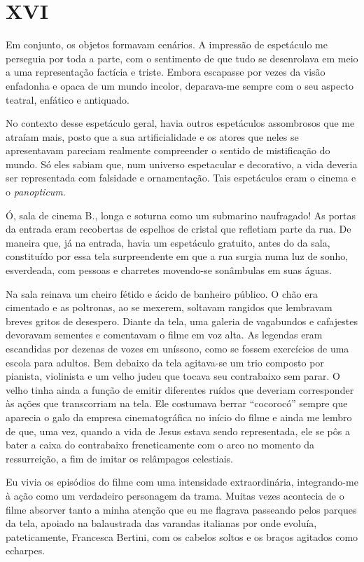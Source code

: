 \chapter*{\centering\Large{XVI}}

Em conjunto, os objetos formavam cenários. A impressão de espetáculo me perseguia por toda a parte, com o sentimento de que tudo se desenrolava em meio a uma representação factícia e triste. Embora escapasse por vezes da visão enfadonha e opaca de um mundo incolor, deparava-me sempre com o seu aspecto teatral, enfático e antiquado.

No contexto desse espetáculo geral, havia outros espetáculos assombrosos que me atraíam mais, posto que a sua artificialidade e os atores que neles se apresentavam pareciam realmente compreender o sentido de mistificação do mundo. Só eles sabiam que, num universo espetacular e decorativo, a vida deveria ser representada com falsidade e ornamentação. Tais espetáculos eram o cinema e o \textit{panopticum}. 

Ó, sala de cinema B., longa e soturna como um submarino naufragado! As portas da entrada eram recobertas de espelhos de cristal que refletiam parte da rua. De maneira que, já na entrada, havia um espetáculo gratuito, antes do da sala, constituído por essa tela surpreendente em que a rua surgia numa luz de sonho, esverdeada, com pessoas e charretes movendo-se sonâmbulas em suas águas.

Na sala reinava um cheiro fétido e ácido de banheiro público. O chão era cimentado e as poltronas, ao se mexerem, soltavam rangidos que lembravam breves gritos de desespero. Diante da tela, uma galeria de vagabundos e cafajestes devoravam sementes e comentavam o filme em voz alta. As legendas eram escandidas por dezenas de vozes em uníssono, como se fossem exercícios de uma escola para adultos. Bem debaixo da tela agitava-se um trio composto por pianista, violinista e um velho judeu que tocava seu contrabaixo sem parar. O velho tinha ainda a função de emitir diferentes ruídos que deveriam corresponder às ações que transcorriam na tela. Ele costumava berrar ``cocorocó'' sempre que aparecia o galo da empresa cinematográfica no início do filme e ainda me lembro de que, uma vez, quando a vida de Jesus estava sendo representada, ele se pôs a bater a caixa do contrabaixo freneticamente com o arco no momento da ressurreição, a fim de imitar os relâmpagos celestiais.

Eu vivia os episódios do filme com uma intensidade extraordinária, integrando-me à ação como um verdadeiro personagem da trama. Muitas vezes acontecia de o filme absorver tanto a minha atenção que eu me flagrava passeando pelos parques da tela, apoiado na balaustrada das varandas italianas por onde evoluía, pateticamente, Francesca Bertini,  com os cabelos soltos e os braços agitados como echarpes.

